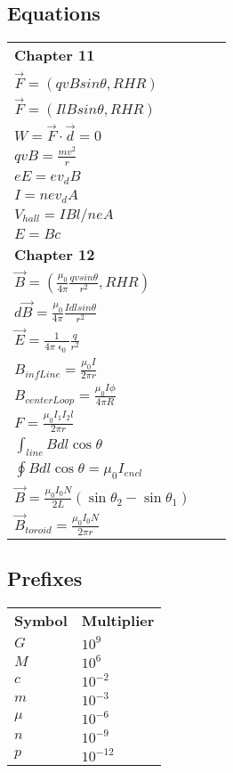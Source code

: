 \documentclass[12pt, letterpaper, twoside]{article}
\begin{document}
  \subsection*{Equations}
    \begin{tabular}{l c l}
    \textbf{Chapter 11} & &\\
      $\vec{F} = (qvB sin \theta, RHR)$\\
	  $\vec{F} = (IlB sin \theta, RHR)$\\
      $W = \vec{F} \cdot \vec{d} = 0$\\
      $qvB = \frac{mv^2}{r}$\\
      $eE = ev_dB$\\
      $I = nev_dA$\\
      $V_{hall} = IBl / neA$\\
      $E = Bc$\\
      \textbf{Chapter 12} & &\\
      $\vec{B} = (\frac{\mu_0}{4 \pi} \frac{qv sin \theta}{r^2}, RHR)$\\
      $d \vec{B} = \frac{\mu_0}{4 \pi} \frac{Idl sin \theta}{r^2}$\\
      $\vec{E} = \frac{1}{4 \pi \upvarepsilon_0} \frac{q}{r^2}$\\
      $B_{infLine} = \frac{\mu_0 I}{2 \pi r}$\\
      $B_{centerLoop} = \frac{\mu_0 I \phi}{4 \pi R}$\\
      $F = \frac{\mu_0 I_1 I_2 l}{2 \pi r}$\\
      $\int_{line} Bdl \cos \theta$\\
      $\oint Bdl \cos \theta = \mu_0 I_{encl}$\\
      $\vec{B} = \frac{\mu_0I_0N}{2L}(\sin \theta_2 - \sin \theta_1)$\\
      $\vec{B}_{toroid} = \frac{\mu_0I_0N}{2 \pi r}$\\
      
    \end{tabular}
    
    
  \subsection*{Prefixes}
    \begin{tabular}{l l}
  	  \textbf{Symbol} & \textbf{Multiplier}\\
      $G$ & $10^9$\\
      $M$ & $10^6$\\
      $c$ & $10^{-2}$\\
      $m$ & $10^{-3}$\\
      $\mu$ & $10^{-6}$\\
      $n$ & $10^{-9}$\\
      $p$ & $10^{-12}$\\
  \end{tabular}
  
\end{document}
